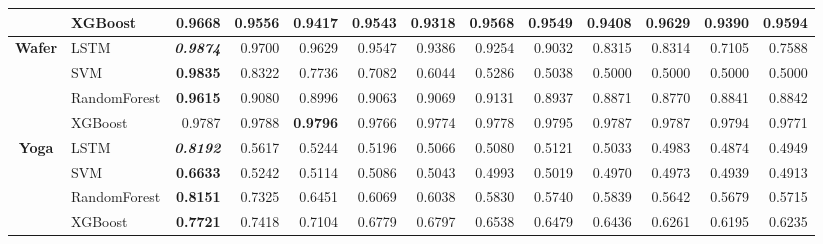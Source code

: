 \begin{table}[H]
\begin{adjustbox}{max width=12cm}
\begin{tabular}{|c|l|r|r|r|r|r|r|r|r|r|r|r|}
			                      & XGBoost      & \textbf{0.9668}          & 0.9556          & 0.9417          & 0.9543                   & 0.9318 & 0.9568          & 0.9549 & 0.9408          & 0.9629                   & 0.9390          & 0.9594                   \\
			\hline
			\textbf{Wafer}        & LSTM         & \textit{\textbf{0.9874}} & 0.9700          & 0.9629          & 0.9547                   & 0.9386 & 0.9254          & 0.9032 & 0.8315          & 0.8314                   & 0.7105          & 0.7588                   \\
			                      & SVM          & \textbf{0.9835}          & 0.8322          & 0.7736          & 0.7082                   & 0.6044 & 0.5286          & 0.5038 & 0.5000          & 0.5000                   & 0.5000          & 0.5000                   \\
			                      & RandomForest & \textbf{0.9615}          & 0.9080          & 0.8996          & 0.9063                   & 0.9069 & 0.9131          & 0.8937 & 0.8871          & 0.8770                   & 0.8841          & 0.8842                   \\
			                      & XGBoost      & 0.9787                   & 0.9788          & \textbf{0.9796} & 0.9766                   & 0.9774 & 0.9778          & 0.9795 & 0.9787          & 0.9787                   & 0.9794          & 0.9771                   \\
			\hline
			\textbf{Yoga}         & LSTM         & \textit{\textbf{0.8192}} & 0.5617          & 0.5244          & 0.5196                   & 0.5066 & 0.5080          & 0.5121 & 0.5033          & 0.4983                   & 0.4874          & 0.4949                   \\
			                      & SVM          & \textbf{0.6633}          & 0.5242          & 0.5114          & 0.5086                   & 0.5043 & 0.4993          & 0.5019 & 0.4970          & 0.4973                   & 0.4939          & 0.4913                   \\
			                      & RandomForest & \textbf{0.8151}          & 0.7325          & 0.6451          & 0.6069                   & 0.6038 & 0.5830          & 0.5740 & 0.5839          & 0.5642                   & 0.5679          & 0.5715                   \\
			                      & XGBoost      & \textbf{0.7721}          & 0.7418          & 0.7104          & 0.6779                   & 0.6797 & 0.6538          & 0.6479 & 0.6436          & 0.6261                   & 0.6195          & 0.6235                   \\

\end{tabular}
\end{adjustbox}
\end{table}
